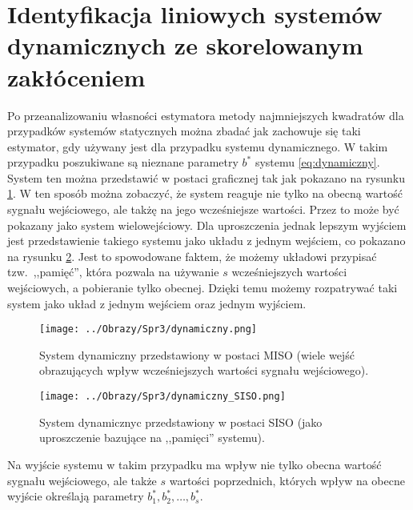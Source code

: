\documentclass[12pt,a4paper]{article}
\begin{document}
\newpage
\section{Identyfikacja liniowych systemów dynamicznych ze skorelowanym zakłóceniem}
Po przeanalizowaniu własności estymatora metody najmniejszych kwadratów dla przypadków systemów statycznych można zbadać jak zachowuje się taki estymator, gdy używany jest dla przypadku systemu dynamicznego.
W takim przypadku poszukiwane są nieznane parametry $b^{*}$ systemu \ref{eq:dynamiczny}.
System ten można przedstawić w postaci graficznej tak jak pokazano na rysunku \ref{fig:dynamiczny_MISO}. W ten sposób można zobaczyć, że system reaguje nie tylko na obecną wartość sygnału wejściowego, ale takżę na jego wcześniejsze wartości. Przez to może być pokazany jako system wielowejściowy.
Dla uproszczenia jednak lepszym wyjściem jest przedstawienie takiego systemu jako układu z jednym wejściem, co pokazano na rysunku \ref{fig:dynamiczny_SISO}. Jest to spowodowane faktem, że możemy układowi przypisać tzw.\ ,,pamięć'', która pozwala na używanie $s$ wcześniejszych wartości wejściowych, a pobieranie tylko obecnej.
Dzięki temu możemy rozpatrywać taki system jako układ z jednym wejściem oraz jednym wyjściem.

\begin{multicols}{2}
		\begin{figure}[H]
		\centering
		\texttt{[image: ../Obrazy/Spr3/dynamiczny.png]} 
		\caption{System dynamiczny przedstawiony w postaci MISO (wiele wejść obrazujących wpływ wcześniejszych wartości sygnału wejściowego).}
		\label{fig:dynamiczny_MISO}
		\end{figure}
	\columnbreak		
		\begin{figure}[H]
		\centering
		\texttt{[image: ../Obrazy/Spr3/dynamiczny\_SISO.png]} 
		\caption{System dynamicznyc przedstawiony w postaci SISO (jako uproszczenie bazujące na ,,pamięci'' systemu).}
		\label{fig:dynamiczny_SISO}
		\end{figure}
\end{multicols}


Na wyjście systemu w takim przypadku ma wpływ nie tylko obecna wartość sygnału wejściowego, ale także $s$ wartości poprzednich, których wpływ na obecne wyjście określają parametry $b_{1}^{*},b_{2}^{*},\dots,b_{s}^{*}$.
\end{document}
